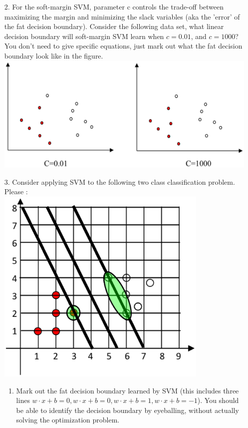\documentclass[12pt,letterpaper]{article}
\begin{document}
\begin{enumerate}
	\item[2.] For the soft-margin SVM, parameter c controls the trade-off between maximizing the margin and minimizing the slack variables (aka the 'error' of the fat decision boundary). Consider the following data set, what linear decision boundary will soft-margin SVM learn when $c = 0.01$, and $c = 1000$? You don't need to give specific equations, just mark out what the fat decision boundary look like in the figure. \\
	\includegraphics[width=6in]{2.eps}
    \pagebreak
	\item[3.] Consider applying SVM to the following two class classification problem. Please : \\
	\includegraphics[width=4in]{3.eps}
	\begin{enumerate} 
		\item Mark out the fat decision boundary learned by SVM (this includes three lines $w\cdot x+b=0, w\cdot x+b=0, w\cdot x+b=1, w\cdot x+b=-1$). You should be able to identify the decision boundary by eyeballing, without actually solving the optimization problem. \\

\end{enumerate}
\end{enumerate}
\end{document}

